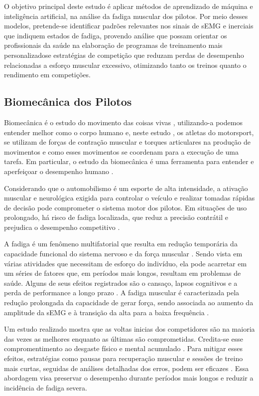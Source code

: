 \documentclass[symbols]{fei}
\begin{document}
O objetivo principal deste estudo é aplicar métodos de aprendizado de máquina e inteligência artificial, na análise da fadiga muscular 
dos pilotos. Por meio desses modelos, pretende-se identificar padrões relevantes nos sinais de sEMG e inerciais que indiquem estados de 
fadiga, provendo análise que possam orientar os profissionais da saúde na elaboração de programas de treinamento mais personalizadose 
estratégias de competição que reduzam perdas de desempenho relacionadas a esforço muscular excessivo, otimizando tanto os treinos quanto 
o rendimento em competições.

\subsection{Biomecânica dos Pilotos}

Biomecânica é o estudo do movimento das coisas vivas \cite{knudson}, utilizando-a podemos entender melhor como o corpo humano e, 
neste estudo , os atletas do motorsport, se utilizam de forças de contração muscular e torques articulares na produção de movimentos e 
como esses movimentos se coordenam para a execução de uma tarefa. Em particular, o estudo da biomecânica é  uma ferramenta para entender 
e aperfeiçoar o desempenho humano \cite{neuromechanics}.  

Considerando que o automobilismo é um esporte de alta intensidade, a ativação muscular e neurológica exigida para controlar o veículo e realizar 
tomadas rápidas de decisão pode comprometer o sistema motor dos pilotos. Em situações de uso prolongado, há risco de fadiga localizada, que reduz 
a precisão contrátil e prejudica o desempenho competitivo \cite{mills2025_forearm_activity}.  

A fadiga é um fenômeno multifatorial que resulta em redução temporária da capacidade funcional do sistema nervoso e da força muscular 
\cite{fatigueimpact}. Sendo vista em várias atividades que necessitam de esforço do indivíduo, ela pode acarretar em um séries de 
fatores que, em períodos mais longos, resultam em problemas de saúde. Alguns de seus efeitos registrados são o cansaço, lapsos 
cognitivos e a perda de performance a longo prazo \cite{fatigueaviation}. A fadiga muscular é caracterizada pela redução 
prolongada da capacidade de gerar força, sendo associada ao aumento da amplitude da sEMG e à transição da alta para a baixa 
frequência \cite{thelastarticle}.

Um estudo realizado mostra que as voltas inicias dos competidores são na maioria das vezes as melhores enquanto as últimas são 
comprometidas. Credita-se esse compromentimento ao desgaste físico e mental acumulado \cite{learningcurves}. 
Para mitigar esses efeitos, estratégias como pausas para recuperação muscular e sessões de treino mais curtas, seguidas de 
análises detalhadas dos erros, podem ser eficazes \cite{learningcurves}. Essa abordagem visa preservar o desempenho durante períodos mais longos e 
reduzir a incidência de fadiga severa.
 
\end{document}
